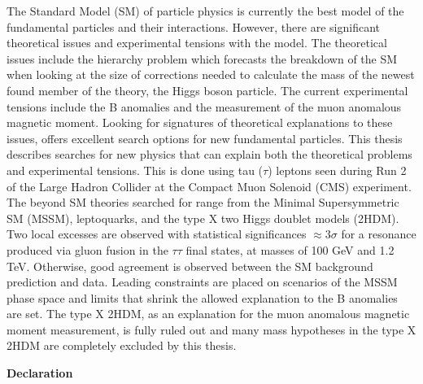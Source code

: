 \begin{titlepage}
\begin{adjustwidth}{1cm}{1cm}
The Standard Model (SM) of particle physics is currently the best model of the fundamental particles and their interactions. 
However, there are significant theoretical issues and experimental tensions with the model. 
The theoretical issues include the hierarchy problem which forecasts the breakdown of the SM when looking at the size of corrections needed to calculate the mass of the newest found member of the theory, the Higgs boson particle. 
The current experimental tensions include the B anomalies and the measurement of the muon anomalous magnetic moment. 
Looking for signatures of theoretical explanations to these issues, offers excellent search options for new fundamental particles. 
This thesis describes searches for new physics that can explain both the theoretical problems and experimental tensions. 
This is done using tau ($\tau$) leptons seen during Run 2 of the Large Hadron Collider at the Compact Muon Solenoid (CMS) experiment. 
The beyond SM theories searched for range from the Minimal Supersymmetric SM (MSSM), leptoquarks, and the type X two Higgs doublet models (2HDM). 
Two local excesses are observed with statistical significances $\approx 3\sigma$ for a resonance produced via gluon fusion in the $\tau\tau$ final states, at masses of 100 GeV and 1.2 TeV. 
Otherwise, good agreement is observed between the SM background prediction and data.
Leading constraints are placed on scenarios of the MSSM phase space and limits that shrink the allowed explanation to the B anomalies are set.
The type X 2HDM, as an explanation for the muon anomalous magnetic moment measurement, is fully ruled out and many mass hypotheses in the type X 2HDM are completely excluded by this thesis.
\end{adjustwidth}
\vspace*{\fill}
\newpage

\vspace*{\fill}
\begin{adjustwidth}{1cm}{1cm}
\begin{center}
\Large \textbf{Declaration}
\vspace{0.5cm}
\end{center}


\end{adjustwidth}
\end{titlepage}
